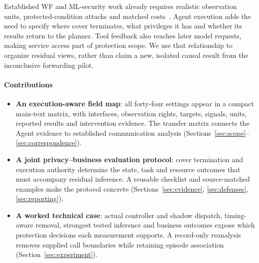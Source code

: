 Established WF and ML-security work already requires realistic observation units, protected-condition attacks and matched costs~\cite{juarez2014critical,mathews2023critical,arp2022dos,tramer2020adaptive}. Agent execution adds the need to specify where cover terminates, what privileges it has and whether its results return to the planner. Tool feedback also reaches later model requests, making service access part of protection scope. We use that relationship to organize residual views, rather than claim a new, isolated causal result from the inconclusive forwarding pilot.

\paragraph{Contributions}
\begin{itemize}
\item \textbf{An execution-aware field map}: all forty-four settings appear in a compact main-text matrix, with interfaces, observation rights, targets, signals, units, reported results and intervention evidence. The transfer matrix connects the Agent evidence to established communication analysis (Sections~\ref{sec:scope}--\ref{sec:correspondence}).
\item \textbf{A joint privacy--business evaluation protocol}: cover termination and execution authority determine the state, task and resource outcomes that must accompany residual inference. A reusable checklist and source-matched examples make the protocol concrete (Sections~\ref{sec:evidence}, \ref{sec:defenses}, \ref{sec:reporting}).
\item \textbf{A worked technical case}: actual controller and shadow dispatch, timing-aware removal, strongest tested inference and business outcomes expose which protection decisions each measurement supports. A record-only reanalysis removes supplied call boundaries while retaining episode association (Section~\ref{sec:experiment}).
\end{itemize}
